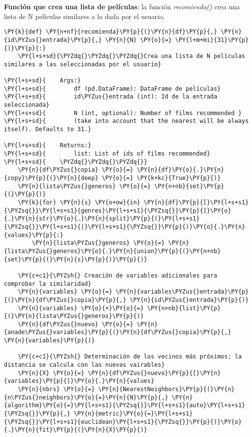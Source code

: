     \textbf{Función que crea una lista de películas}: la función
\emph{recomienda()} crea una lista de N películas similares a la dada
por el usuario.

    \begin{tcolorbox}[breakable, size=fbox, boxrule=1pt, pad at break*=1mm,colback=cellbackground, colframe=cellborder]
\begin{Verbatim}[commandchars=\\\{\}]
\PY{k}{def} \PY{n+nf}{recomienda}\PY{p}{(}\PY{n}{df}\PY{p}{,} \PY{n}{id\PYZus{}entrada}\PY{p}{,} \PY{n}{N} \PY{o}{=} \PY{l+m+mi}{31}\PY{p}{)}\PY{p}{:}
    \PY{l+s+sd}{\PYZdq{}\PYZdq{}\PYZdq{}Crea una lista de N películas similares a las seleccionadas por el usuario}

\PY{l+s+sd}{    Args:}
\PY{l+s+sd}{        df (pd.DataFrame): DataFrame de películas}
\PY{l+s+sd}{        id\PYZus{}entrada (int): Id de la entrada seleccionada}
\PY{l+s+sd}{        N (int, optional): Number of films recommended }
\PY{l+s+sd}{        (take into account that the nearest will be always itself). Defaults to 31.}

\PY{l+s+sd}{    Returns:}
\PY{l+s+sd}{        list: List of ids of films recommended}
\PY{l+s+sd}{    \PYZdq{}\PYZdq{}\PYZdq{}}
    \PY{n}{df\PYZus{}copia} \PY{o}{=} \PY{n}{df}\PY{o}{.}\PY{n}{copy}\PY{p}{(}\PY{n}{deep} \PY{o}{=} \PY{k+kc}{True}\PY{p}{)}    
    \PY{n}{lista\PYZus{}generos} \PY{o}{=} \PY{n+nb}{set}\PY{p}{(}\PY{p}{)}
    \PY{k}{for} \PY{n}{s} \PY{o+ow}{in} \PY{n}{df}\PY{p}{[}\PY{l+s+s1}{\PYZsq{}}\PY{l+s+s1}{genres}\PY{l+s+s1}{\PYZsq{}}\PY{p}{]}\PY{o}{.}\PY{n}{str}\PY{o}{.}\PY{n}{split}\PY{p}{(}\PY{l+s+s1}{\PYZsq{}}\PY{l+s+s1}{|}\PY{l+s+s1}{\PYZsq{}}\PY{p}{)}\PY{o}{.}\PY{n}{values}\PY{p}{:}
        \PY{n}{lista\PYZus{}generos} \PY{o}{=} \PY{n}{lista\PYZus{}generos}\PY{o}{.}\PY{n}{union}\PY{p}{(}\PY{n+nb}{set}\PY{p}{(}\PY{n}{s}\PY{p}{)}\PY{p}{)}    

    \PY{c+c1}{\PYZsh{} Creación de variables adicionales para comprobar la similaridad}
    \PY{n}{variables} \PY{o}{=} \PY{n}{variables\PYZus{}entrada}\PY{p}{(}\PY{n}{df\PYZus{}copia}\PY{p}{,} \PY{n}{id\PYZus{}entrada}\PY{p}{)}
    \PY{n}{variables} \PY{o}{+}\PY{o}{=} \PY{n+nb}{list}\PY{p}{(}\PY{n}{lista\PYZus{}generos}\PY{p}{)}
    \PY{n}{df\PYZus{}nuevo} \PY{o}{=} \PY{n}{anade\PYZus{}variables}\PY{p}{(}\PY{n}{df\PYZus{}copia}\PY{p}{,} \PY{n}{variables}\PY{p}{)}

    \PY{c+c1}{\PYZsh{} Determinación de los vecinos más próximos: la distancia se calcula con las nuevas vairables}
    \PY{n}{X} \PY{o}{=} \PY{n}{df\PYZus{}nuevo}\PY{p}{[}\PY{n}{variables}\PY{p}{]}\PY{o}{.}\PY{n}{values}
    \PY{n}{nbrs} \PY{o}{=} \PY{n}{NearestNeighbors}\PY{p}{(}\PY{n}{n\PYZus{}neighbors}\PY{o}{=}\PY{n}{N}\PY{p}{,} \PY{n}{algorithm}\PY{o}{=}\PY{l+s+s1}{\PYZsq{}}\PY{l+s+s1}{auto}\PY{l+s+s1}{\PYZsq{}}\PY{p}{,} \PY{n}{metric}\PY{o}{=}\PY{l+s+s1}{\PYZsq{}}\PY{l+s+s1}{euclidean}\PY{l+s+s1}{\PYZsq{}}\PY{p}{)}\PY{o}{.}\PY{n}{fit}\PY{p}{(}\PY{n}{X}\PY{p}{)}
    

\end{Verbatim}
\end{tcolorbox}
